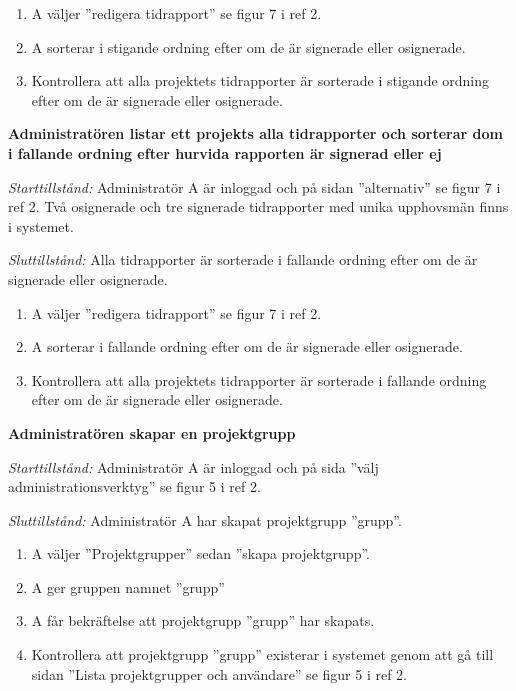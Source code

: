 \documentclass[a4paper]{article}
\begin{document}
\begin{FT}
\begin{enumerate}
\item A väljer ''redigera tidrapport'' se figur 7 i ref 2.
\item A sorterar i stigande ordning efter om de är signerade eller osignerade.
\item Kontrollera att alla projektets tidrapporter är sorterade i stigande ordning efter om de är signerade eller osignerade.
\end{enumerate}

\item %
\textbf{Administratören listar ett projekts alla tidrapporter och sorterar dom i fallande ordning efter hurvida rapporten är signerad eller ej}

\emph{Starttillstånd:} Administratör A är inloggad och på sidan ''alternativ'' se figur 7 i ref 2. Två osignerade och tre signerade tidrapporter med unika upphovsmän finns i systemet.

\emph{Sluttillstånd:} Alla tidrapporter är sorterade i fallande ordning efter om de är signerade eller osignerade.

\begin{enumerate}
\item A väljer ''redigera tidrapport'' se figur 7 i ref 2.
\item A sorterar i fallande ordning efter om de är signerade eller osignerade.
\item Kontrollera att alla projektets tidrapporter är sorterade i fallande ordning efter om de är signerade eller osignerade.
\end{enumerate}

\item %
\textbf{Administratören skapar en projektgrupp}

\emph{Starttillstånd:} Administratör A är inloggad och på sida ''välj administrationsverktyg'' se figur 5 i ref 2.

\emph{Sluttillstånd:} Administratör A har skapat projektgrupp ''grupp''.

\begin{enumerate}
\item A väljer ''Projektgrupper'' sedan ''skapa projektgrupp''.
\item A ger gruppen namnet ''grupp''
\item A får bekräftelse att projektgrupp ''grupp'' har skapats.
\item Kontrollera att projektgrupp ''grupp'' existerar i systemet genom att gå till sidan ''Lista projektgrupper och användare'' se figur 5 i ref 2.
\end{enumerate}


\end{FT}
\end{document}
